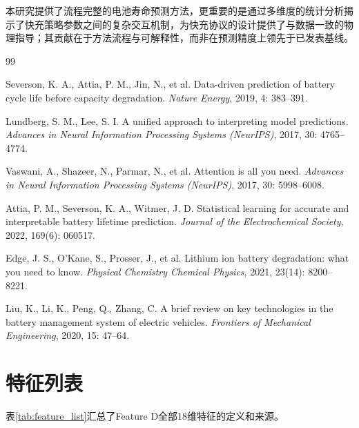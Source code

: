 \documentclass[12pt,a4paper]{ctexart}
\begin{document}
本研究提供了流程完整的电池寿命预测方法，更重要的是通过多维度的统计分析揭示了快充策略参数之间的复杂交互机制，为快充协议的设计提供了与数据一致的物理指导；其贡献在于方法流程与可解释性，而非在预测精度上领先于已发表基线。

\begin{thebibliography}{99}

Severson, K. A., Attia, P. M., Jin, N., et al.
\newblock Data-driven prediction of battery cycle life before capacity degradation.
\newblock \textit{Nature Energy}, 2019, 4: 383--391.

Lundberg, S. M., Lee, S. I.
\newblock A unified approach to interpreting model predictions.
\newblock \textit{Advances in Neural Information Processing Systems (NeurIPS)}, 2017, 30: 4765--4774.

Vaswani, A., Shazeer, N., Parmar, N., et al.
\newblock Attention is all you need.
\newblock \textit{Advances in Neural Information Processing Systems (NeurIPS)}, 2017, 30: 5998--6008.

Attia, P. M., Severson, K. A., Witmer, J. D.
\newblock Statistical learning for accurate and interpretable battery lifetime prediction.
\newblock \textit{Journal of the Electrochemical Society}, 2022, 169(6): 060517.

Edge, J. S., O'Kane, S., Prosser, J., et al.
\newblock Lithium ion battery degradation: what you need to know.
\newblock \textit{Physical Chemistry Chemical Physics}, 2021, 23(14): 8200--8221.

Liu, K., Li, K., Peng, Q., Zhang, C.
\newblock A brief review on key technologies in the battery management system of electric vehicles.
\newblock \textit{Frontiers of Mechanical Engineering}, 2020, 15: 47--64.

\end{thebibliography}

\appendix
\section{特征列表}

表\ref{tab:feature_list}汇总了Feature D全部18维特征的定义和来源。
\end{document}
